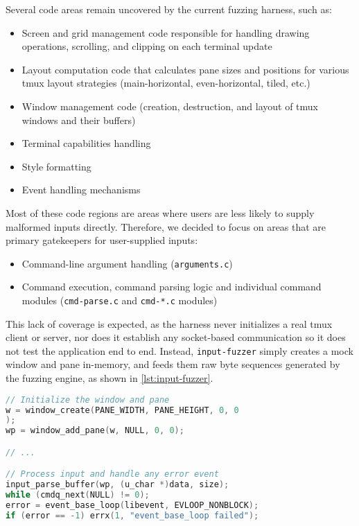 Several code areas remain uncovered by the current fuzzing harness, such as:
\begin{itemize}
    \item Screen and grid management code responsible for handling drawing operations, scrolling, and clipping on each terminal update
    \item Layout computation code that calculates pane sizes and positions for various tmux layout strategies (main-horizontal, even-horizontal, tiled, etc.)
    \item Window management code (creation, destruction, and layout of tmux windows and their buffers)
    \item Terminal capabilities handling
    \item Style formatting
    \item Event handling mechanisms
\end{itemize}

Most of these code regions are areas where users are less likely to supply malformed inputs directly. Therefore, we decided to focus on areas that are primary gatekeepers for user-supplied inputs:

\begin{itemize}
    \item Command-line argument handling (\texttt{arguments.c})
	\item Command execution, command parsing logic and individual command modules (\texttt{cmd-parse.c} and \texttt{cmd-*.c} modules)
\end{itemize}

This lack of coverage is expected, as the harness never initializes a real tmux client or server, nor does it establish any socket-based communication so it does not test the application end to end. Instead, \texttt{input-fuzzer} simply creates a mock window and pane in-memory, and feeds them raw byte sequences generated by the fuzzing engine, as shown in \autoref{lst:input-fuzzer}.

\begin{lstlisting}[language=C,caption={Core of the `input-fuzzer` fuzzer code, including in-memory window and pane creation},label={lst:input-fuzzer}]
// Initialize the window and pane
w = window_create(PANE_WIDTH, PANE_HEIGHT, 0, 0
);
wp = window_add_pane(w, NULL, 0, 0);

// ...

// Process input and handle any error event
input_parse_buffer(wp, (u_char *)data, size);
while (cmdq_next(NULL) != 0);
error = event_base_loop(libevent, EVLOOP_NONBLOCK);
if (error == -1) errx(1, "event_base_loop failed");
\end{lstlisting}

